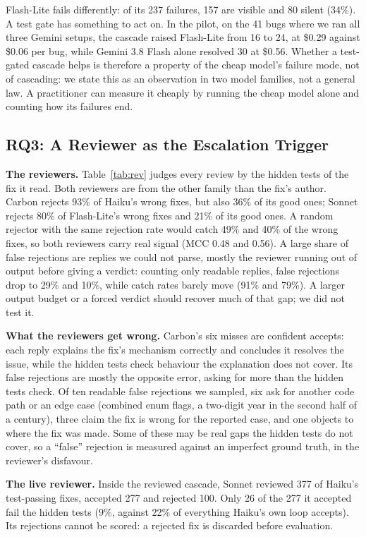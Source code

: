 \documentclass[10pt,conference]{IEEEtran}
\begin{document}
Flash-Lite fails differently: of its 237 failures, 157 are visible and 80 silent (34\%). A test gate has something to
act on. In the pilot, on the 41 bugs where we ran all three Gemini setups, the cascade raised Flash-Lite from 16 to 24, at \$0.29 against \$0.06 per bug, while Gemini 3.8 Flash alone resolved 30 at \$0.56. Whether a test-gated cascade helps is therefore
a property of the cheap model's failure mode, not of cascading: we state this as an observation in two model families,
not a general law. A practitioner can measure it cheaply by running the cheap model alone and counting how its
failures end.

\subsection{RQ3: A Reviewer as the Escalation Trigger}
\textbf{The reviewers.} Table~\ref{tab:rev} judges every review by the hidden tests of the fix it read. Both reviewers
are from the other family than the fix's author. Carbon rejects 93\% of Haiku's wrong fixes, but also 36\% of its good
ones; Sonnet rejects 80\% of Flash-Lite's wrong fixes and 21\% of its good ones. A random rejector with the same
rejection rate would catch 49\% and 40\% of the wrong fixes, so both reviewers carry real signal (MCC 0.48 and 0.56).
A large share of false rejections are replies we could not parse, mostly the reviewer running out of output before
giving a verdict: counting only readable replies, false rejections drop to 29\% and 10\%, while catch rates barely
move (91\% and 79\%). A larger output budget or a forced verdict should recover much of that gap; we did not test it.

\textbf{What the reviewers get wrong.} Carbon's six misses are confident accepts: each reply explains the fix's
mechanism correctly and concludes it resolves the issue, while the hidden tests check behaviour the explanation does
not cover. Its false rejections are mostly the opposite error, asking for more than the hidden tests check. Of ten
readable false rejections we sampled, six ask for another code path or an edge case (combined enum flags, a
two-digit year in the second half of a century), three claim the fix is wrong for the reported case, and one objects
to where the fix was made. Some of these may be real gaps the hidden tests do not cover, so a ``false'' rejection is
measured against an imperfect ground truth, in the reviewer's disfavour.



\textbf{The live reviewer.} Inside the reviewed cascade, Sonnet reviewed 377 of Haiku's test-passing fixes,
accepted 277 and rejected 100. Only 26 of the 277 it accepted fail the hidden tests (9\%, against 22\% of everything
Haiku's own loop accepts). Its rejections cannot be scored: a rejected fix is discarded before evaluation.
\end{document}
